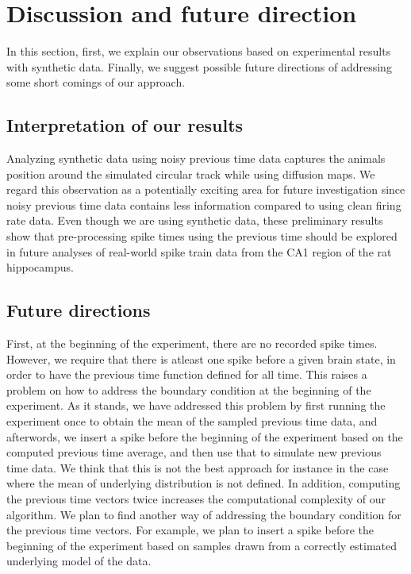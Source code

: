 \section{Discussion and future direction}
In this section, first, we explain our observations based on experimental results with synthetic data.  Finally, we suggest possible future directions of addressing some short comings of our approach.


\subsection{Interpretation of our results}
Analyzing synthetic data using noisy previous time data captures the animals position around the simulated circular track 
while using diffusion maps. We regard this observation as a potentially exciting area for future investigation since noisy 
previous time data contains less information compared to using clean firing rate data. Even though we are using  synthetic data, these preliminary results show that pre-processing spike times using the previous time should be explored in future analyses of real-world spike train data from the CA1 region of the rat hippocampus. 

\subsection{Future directions}
First, at the beginning of the experiment, there are no recorded spike times.
However, we require that there is atleast one spike before a given brain state, in order to have the previous time function defined for all time. This raises a problem on how to address the boundary condition at the beginning
of the experiment. As it stands, we have addressed this problem by first running the experiment once to obtain the mean of the sampled previous time data, and afterwords, we insert a spike before the beginning of the experiment based on the computed previous time average, and then use that to simulate new  previous time data. We think that this is not the best approach for instance in the case where the mean of underlying distribution is not defined. In addition, computing the previous time vectors twice increases the computational complexity of our algorithm. We plan to find another way of addressing the boundary condition for the previous time vectors. For example, we plan to insert a spike before the beginning of the experiment based on samples drawn from a correctly estimated underlying model of the data.\\

